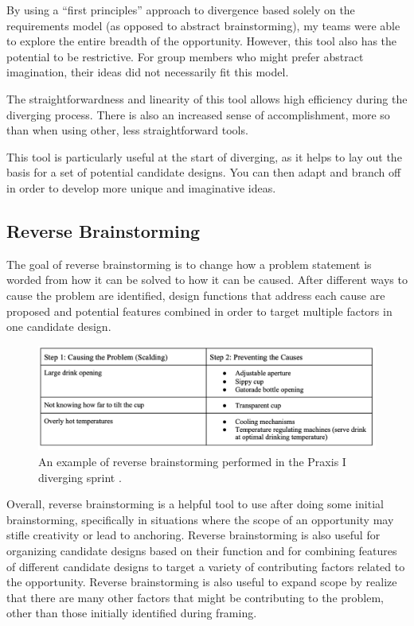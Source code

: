 \documentclass{report}
\begin{document}
By using a “first principles” approach to divergence based solely on the requirements model (as opposed 
to abstract brainstorming), my teams were able to explore the entire breadth of the opportunity. However, 
this tool also has the potential to be restrictive. For group members who might prefer abstract imagination, their 
ideas did not necessarily fit this model.

The straightforwardness and linearity of this tool allows high efficiency during the 
diverging process. There is also an increased sense of accomplishment, more so than when using 
other, less straightforward tools.

This tool is particularly useful at the start of diverging, as it helps to lay out the basis 
for a set of potential candidate designs. You can then adapt and branch off in order to develop 
more unique and imaginative ideas.

\subsection{Reverse Brainstorming}

The goal of reverse brainstorming is to change how a problem statement is worded from how it can be 
solved to how it can be caused. After different ways to cause the problem are identified, design 
functions that address each cause are proposed and potential features combined in order to target multiple factors 
in one candidate design.

\begin{figure}[h]
    \centering
    \includegraphics[width=\textwidth/2]{images/reversebrainstorm.png}
    \hfill
    \caption{An example of reverse brainstorming performed in the Praxis I diverging sprint \cite{candidatestools}.}
\end{figure}

Overall, reverse brainstorming is a helpful tool to use after doing some initial brainstorming, specifically 
in situations where the scope of an opportunity may stifle creativity or lead to anchoring. Reverse 
brainstorming is also useful for organizing candidate designs based on their function and for combining 
features of different candidate designs to target a variety of contributing factors related to the opportunity. 
Reverse brainstorming is also useful to expand scope by realize that there are many 
other factors that might be contributing to the problem, other than those initially identified during framing.
\pagebreak
\end{document}
